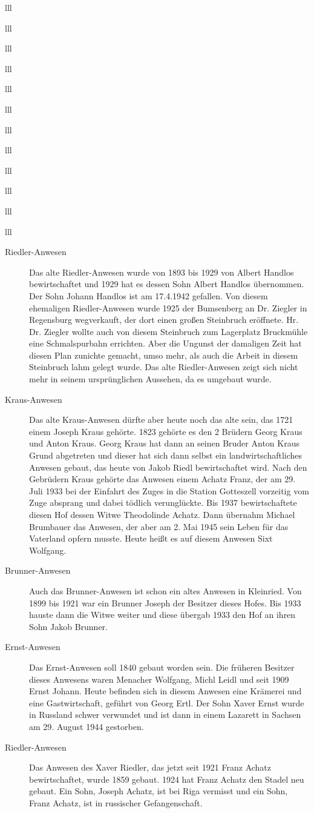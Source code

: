 \documentclass[12pt,a4pager]{book}
\begin{document}
\begin{tabuluar}{lll}
\begin{tabuluar}{lll}
\begin{tabuluar}{lll}
\begin{tabuluar}{lll}
\begin{tabuluar}{lll}
\begin{tabuluar}{lll}
\begin{tabuluar}{lll}
\begin{tabuluar}{lll}
\begin{tabuluar}{lll}
\begin{tabuluar}{lll}
\begin{tabuluar}{lll}
\begin{tabuluar}{lll}
\begin{description}
\item[Riedler-Anwesen] Das alte Riedler-Anwesen wurde von 1893 bis 1929 von
Albert Handlos bewirtschaftet und 1929 hat es dessen Sohn Albert Handlos
übernommen. Der Sohn Johann Handlos ist am 17.4.1942 gefallen. Von diesem
ehemaligen Riedler-Anwesen wurde 1925 der Bumsenberg an Dr. Ziegler in
Regensburg wegverkauft, der dort einen großen Steinbruch eröffnete. Hr. Dr.
Ziegler wollte auch von diesem Steinbruch zum Lagerplatz Bruckmühle eine
Schmalspurbahn errichten. Aber die Ungunst der damaligen Zeit hat diesen Plan
zunichte gemacht, umso mehr, als auch die Arbeit in diesem Steinbruch lahm
gelegt wurde. Das alte Riedler-Anwesen zeigt sich nicht mehr in seinem
ursprünglichen Aussehen, da es umgebaut wurde.

\item[Kraus-Anwesen] Das alte Kraus-Anwesen dürfte aber heute noch das alte
sein, das 1721 einem Joseph Kraus gehörte. 1823 gehörte es den 2 Brüdern Georg
Kraus und Anton Kraus. Georg Kraus hat dann an seinen Bruder Anton Kraus Grund
abgetreten und dieser hat sich dann selbst ein landwirtschaftliches Anwesen
gebaut, das heute von Jakob Riedl bewirtschaftet wird. Nach den Gebrüdern Kraus
gehörte das Anwesen einem Achatz Franz, der am 29. Juli 1933 bei der Einfahrt
des Zuges in die Station Gotteszell vorzeitig vom Zuge absprang und dabei
tödlich verunglückte. Bis 1937 bewirtschaftete diesen Hof dessen Witwe
Theodolinde Achatz. Dann übernahm Michael Brumbauer das Anwesen, der aber am 2.
Mai 1945 sein Leben für das Vaterland opfern musste. Heute heißt es auf diesem
Anwesen Sixt Wolfgang.

\item[Brunner-Anwesen] Auch das Brunner-Anwesen ist schon ein altes Anwesen in
Kleinried. Von 1899 bis 1921 war ein Brunner Joseph der Besitzer dieses Hofes.
Bis 1933 hauste dann die Witwe weiter und diese übergab 1933 den Hof an ihren
Sohn Jakob Brunner.

\item[Ernst-Anwesen] Das Ernst-Anwesen soll 1840 gebaut worden sein. Die
früheren Besitzer dieses Anwesens waren Menacher Wolfgang, Michl Leidl und seit
1909 Ernst Johann. Heute befinden sich in diesem Anwesen eine Krämerei und eine
Gastwirtschaft, geführt von Georg Ertl. Der Sohn Xaver Ernst wurde in Russland
schwer verwundet und ist dann in einem Lazarett in Sachsen am 29. August 1944
gestorben.

\item[Riedler-Anwesen] Das Anwesen des Xaver Riedler, das jetzt seit 1921 Franz
Achatz bewirtschaftet, wurde 1859 gebaut. 1924 hat Franz Achatz den Stadel neu
gebaut. Ein Sohn, Joseph Achatz, ist bei Riga vermisst und ein Sohn, Franz
Achatz, ist in russischer Gefangenschaft.


\end{description}
\end{tabuluar}
\end{tabuluar}
\end{tabuluar}
\end{tabuluar}
\end{tabuluar}
\end{tabuluar}
\end{tabuluar}
\end{tabuluar}
\end{tabuluar}
\end{tabuluar}
\end{tabuluar}
\end{tabuluar}
\end{document}
